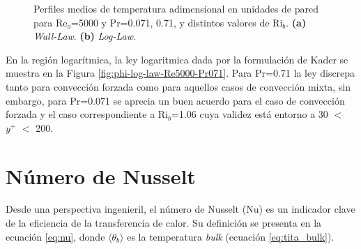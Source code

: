 \begin{figure}[H]
  \centering
    \caption{Perfiles medios de temperatura adimensional en unidades de pared para Re$_o$=5000 y Pr=0.071, 0.71, y distintos valores de Ri$_b$. \textbf{(a)} \textit{Wall-Law}. \textbf{(b)} \textit{Log-Law}.}
    \label{fig:phi-plus-Re5000-Pr071}
\end{figure}

En la región logarítmica, la ley logaritmica dada por la formulación de Kader \cite{kader1981temperature} se muestra en la Figura \ref{fig:phi-log-law-Re5000-Pr071}. Para Pr=0.71 la ley discrepa tanto para convección forzada como para aquellos casos de convección mixta, sin embargo, para Pr=0.071 se aprecia un buen acuerdo para el caso de convección forzada y el caso correspondiente a Ri$_b$=1.06 cuya validez está entorno a 30 $<$ $y^+$ $<$ 200.   

\newpage
\section{Número de Nusselt} \label{sec:nu}

Desde una perspectiva ingenieril, el número de Nusselt (Nu) es un indicador clave de la eficiencia de la transferencia de calor. Su definición se presenta en la ecuación \ref{eq:nu}, donde $\langle \theta_b \rangle$ es la temperatura \textit{bulk} (ecuación \ref{eq:tita_bulk}). 

